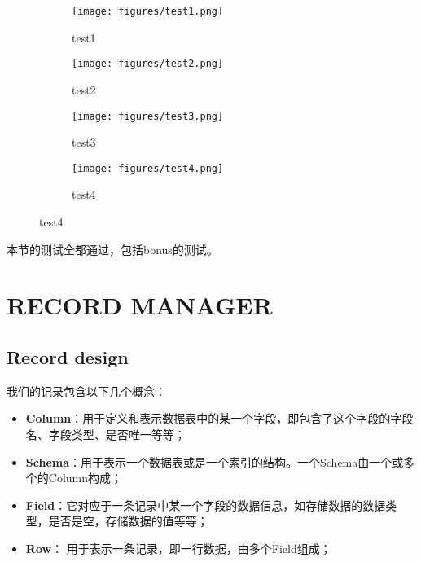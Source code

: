 \documentclass[12pt,hyperref,a4paper,UTF8]{ctexart}
\begin{document}
\begin{figure}[!htbp]
  \centering
  \begin{subfigure}
      \centering
      \texttt{[image: figures/test1.png]}
      \caption{test1}
      \label{fig:test1}
  \end{subfigure}

  \begin{subfigure}
      \centering
      \texttt{[image: figures/test2.png]}
      \caption{test2}
      \label{fig:test2}
  \end{subfigure}

  \begin{subfigure}
      \centering
      \texttt{[image: figures/test3.png]}
      \caption{test3}
      \label{fig:test3}
  \end{subfigure}

  \begin{subfigure}
    \centering
    \texttt{[image: figures/test4.png]}
    \caption{test4}
    \label{fig:test4}
\end{subfigure}
\end{figure}

本节的测试全都通过，包括bonus的测试。

\pagebreak

\section{RECORD MANAGER}

\subsection{Record design}

我们的记录包含以下几个概念：

\begin{itemize}
    \item \textbf{Column}：用于定义和表示数据表中的某一个字段，即包含了这个字段的字段名、字段类型、是否唯一等等；
    \item \textbf{Schema}：用于表示一个数据表或是一个索引的结构。一个Schema由一个或多个的Column构成；
    \item \textbf{Field}：它对应于一条记录中某一个字段的数据信息，如存储数据的数据类型，是否是空，存储数据的值等等；
    \item \textbf{Row}： 用于表示一条记录，即一行数据，由多个Field组成；
\end{itemize}
\end{document}
